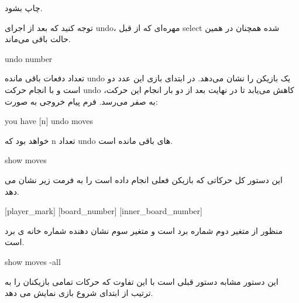 \documentclass[]{article}
\begin{document}
چاپ بشود.

توجه کنید که بعد از اجرای undo، مهره‌ای که از قبل select شده همچنان در همین حالت باقی می‌ماند.


\hrulefill


\begin{tcolorbox}[boxrule=0pt]
	\begin{latin}
  	  \large{
  	  	undo number
		}
	\end{latin}
\end{tcolorbox}

تعداد دفعات باقی مانده undo یک بازیکن را نشان می‌دهد. در ابتدای بازی این عدد دو است و با انجام حرکت undo کاهش می‌یابد تا در نهایت بعد از دو بار انجام این حرکت، به صفر می‌رسد. فرم پیام خروجی به صورت:


\begin{tcolorbox}[boxrule=0pt]
	\begin{latin}
  	  \large{
  	  	you have [n] undo moves
		}
	\end{latin}
\end{tcolorbox}

خواهد بود که n تعداد undo های باقی مانده است.

\hrulefill


\begin{tcolorbox}[boxrule=0pt]
	\begin{latin}
  	  \large{
  	  	show moves
		}
	\end{latin}
\end{tcolorbox}

این دستور کل حرکاتی که بازیکن فعلی انجام داده است را به فرمت زیر نشان می دهد.

\begin{tcolorbox}[boxrule=0pt]
	\begin{latin}
		\large{
			[player\_mark] [board\_number] [inner\_board\_number]
		}
	\end{latin}
\end{tcolorbox}
منظور از متغیر دوم شماره برد است و متغیر سوم نشان دهنده شماره خانه ی برد است.\\

\hrulefill


\begin{tcolorbox}[boxrule=0pt]
	\begin{latin}
  	  \large{
  	  	show moves -all
		}
	\end{latin}
\end{tcolorbox}

این دستور مشابه دستور قبلی است با این تفاوت که حرکات تمامی بازیکنان را به ترتیب از ابتدای شروع بازی نمایش می دهد.
\end{document}
